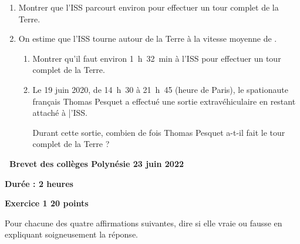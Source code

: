 \documentclass[11pt]{article}
\begin{document}
\begin{enumerate}[resume]
	\item Montrer que l’ISS parcourt environ  pour effectuer un tour complet de la Terre.

	\item On estime que l’ISS tourne autour de la Terre à la vitesse moyenne de .
	\begin{enumerate}
		\item Montrer qu’il faut environ 1~h~32~min à l'ISS pour effectuer un tour complet de la Terre.
		\item Le 19 juin 2020, de 14~h~30 à 21~h~45 (heure de Paris), le spationaute français Thomas Pesquet a effectué une sortie extravéhiculaire en restant attaché à |’ISS.

		Durant cette sortie, combien de fois Thomas Pesquet a-t-il fait le tour complet de la Terre ?
	\end{enumerate}
\end{enumerate}
\newpage
\hypertarget{Polynesie}{}

\label{Polynesie}

\pagestyle{fancy}
\thispagestyle{empty}
\begin{center}

{\Large \textbf{\decofourleft~Brevet des collèges Polynésie 23 juin 2022~\decofourright}}

\bigskip

\textbf{Durée : 2 heures} \end{center}

\bigskip

\textbf{Exercice 1 \hfill 20 points}

\medskip

Pour chacune des quatre affirmations suivantes, dire si elle vraie ou fausse en expliquant soigneusement la réponse.

\medskip
\end{document}
